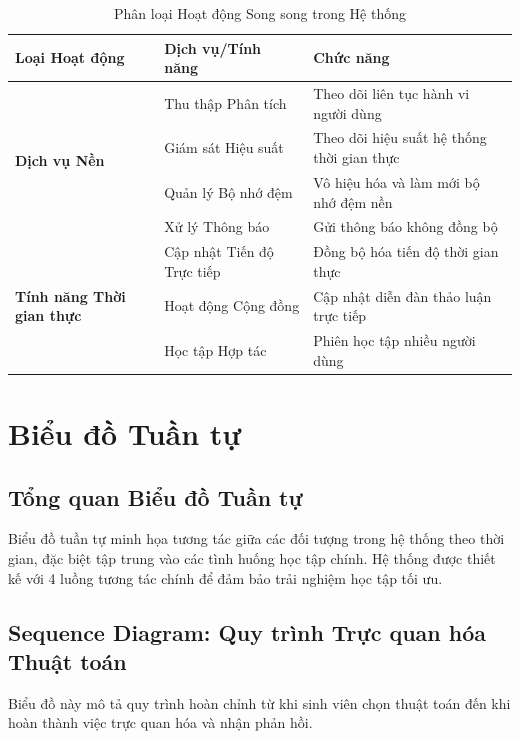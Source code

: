 \begin{table}[H]
\centering
\caption{Phân loại Hoạt động Song song trong Hệ thống}
\label{tab:parallel-activities}
\begin{tabular}{|p{3.5cm}|p{4cm}|p{5.5cm}|}
\hline
\textbf{Loại Hoạt động} & \textbf{Dịch vụ/Tính năng} & \textbf{Chức năng} \\
\hline
\multirow{4}{3.5cm}{\textbf{Dịch vụ Nền}} 
& Thu thập Phân tích & Theo dõi liên tục hành vi người dùng \\
\cline{2-3}
& Giám sát Hiệu suất & Theo dõi hiệu suất hệ thống thời gian thực \\
\cline{2-3}
& Quản lý Bộ nhớ đệm & Vô hiệu hóa và làm mới bộ nhớ đệm nền \\
\cline{2-3}
& Xử lý Thông báo & Gửi thông báo không đồng bộ \\
\hline
\multirow{3}{3.5cm}{\textbf{Tính năng Thời gian thực}} 
& Cập nhật Tiến độ Trực tiếp & Đồng bộ hóa tiến độ thời gian thực \\
\cline{2-3}
& Hoạt động Cộng đồng & Cập nhật diễn đàn thảo luận trực tiếp \\
\cline{2-3}
& Học tập Hợp tác & Phiên học tập nhiều người dùng \\
\hline
\end{tabular}
\end{table}

\section{Biểu đồ Tuần tự}
\label{sec:sequence-diagram}

\subsection{Tổng quan Biểu đồ Tuần tự}
\label{subsec:sequence-overview}

Biểu đồ tuần tự minh họa tương tác giữa các đối tượng trong hệ thống theo thời gian, đặc biệt tập trung vào các tình huống học tập chính. Hệ thống được thiết kế với 4 luồng tương tác chính để đảm bảo trải nghiệm học tập tối ưu.

\subsection{Sequence Diagram: Quy trình Trực quan hóa Thuật toán}
\label{subsec:algorithm-visualization-sequence}

Biểu đồ này mô tả quy trình hoàn chỉnh từ khi sinh viên chọn thuật toán đến khi hoàn thành việc trực quan hóa và nhận phản hồi.

